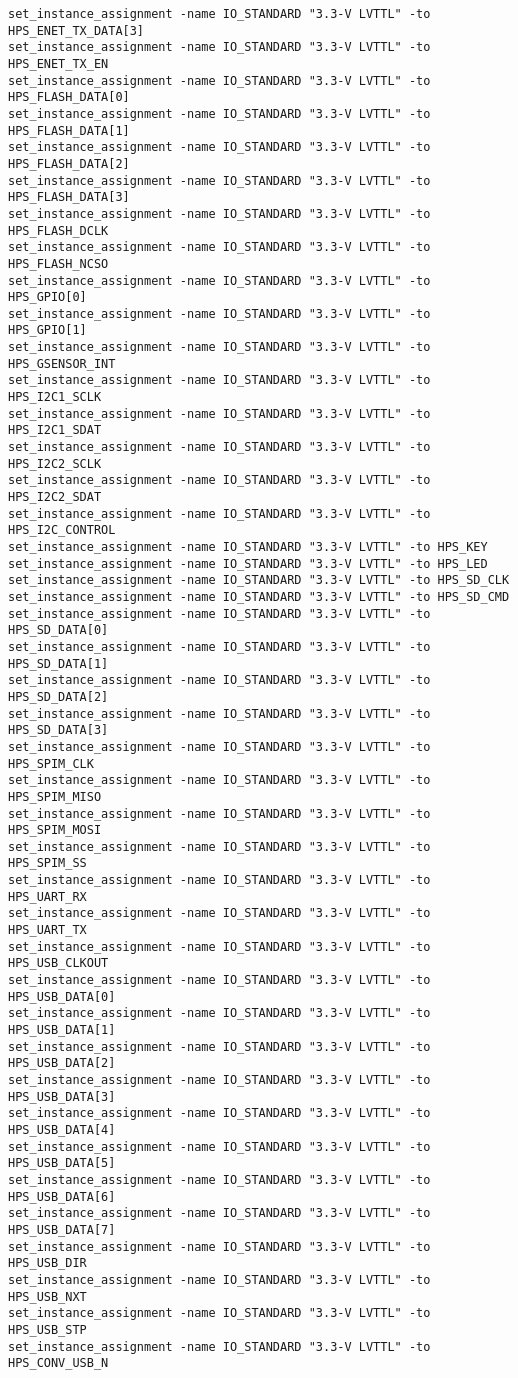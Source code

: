 \begin{verbatim}
set_instance_assignment -name IO_STANDARD "3.3-V LVTTL" -to HPS_ENET_TX_DATA[3]
set_instance_assignment -name IO_STANDARD "3.3-V LVTTL" -to HPS_ENET_TX_EN
set_instance_assignment -name IO_STANDARD "3.3-V LVTTL" -to HPS_FLASH_DATA[0]
set_instance_assignment -name IO_STANDARD "3.3-V LVTTL" -to HPS_FLASH_DATA[1]
set_instance_assignment -name IO_STANDARD "3.3-V LVTTL" -to HPS_FLASH_DATA[2]
set_instance_assignment -name IO_STANDARD "3.3-V LVTTL" -to HPS_FLASH_DATA[3]
set_instance_assignment -name IO_STANDARD "3.3-V LVTTL" -to HPS_FLASH_DCLK
set_instance_assignment -name IO_STANDARD "3.3-V LVTTL" -to HPS_FLASH_NCSO
set_instance_assignment -name IO_STANDARD "3.3-V LVTTL" -to HPS_GPIO[0]
set_instance_assignment -name IO_STANDARD "3.3-V LVTTL" -to HPS_GPIO[1]
set_instance_assignment -name IO_STANDARD "3.3-V LVTTL" -to HPS_GSENSOR_INT
set_instance_assignment -name IO_STANDARD "3.3-V LVTTL" -to HPS_I2C1_SCLK
set_instance_assignment -name IO_STANDARD "3.3-V LVTTL" -to HPS_I2C1_SDAT
set_instance_assignment -name IO_STANDARD "3.3-V LVTTL" -to HPS_I2C2_SCLK
set_instance_assignment -name IO_STANDARD "3.3-V LVTTL" -to HPS_I2C2_SDAT
set_instance_assignment -name IO_STANDARD "3.3-V LVTTL" -to HPS_I2C_CONTROL
set_instance_assignment -name IO_STANDARD "3.3-V LVTTL" -to HPS_KEY
set_instance_assignment -name IO_STANDARD "3.3-V LVTTL" -to HPS_LED
set_instance_assignment -name IO_STANDARD "3.3-V LVTTL" -to HPS_SD_CLK
set_instance_assignment -name IO_STANDARD "3.3-V LVTTL" -to HPS_SD_CMD
set_instance_assignment -name IO_STANDARD "3.3-V LVTTL" -to HPS_SD_DATA[0]
set_instance_assignment -name IO_STANDARD "3.3-V LVTTL" -to HPS_SD_DATA[1]
set_instance_assignment -name IO_STANDARD "3.3-V LVTTL" -to HPS_SD_DATA[2]
set_instance_assignment -name IO_STANDARD "3.3-V LVTTL" -to HPS_SD_DATA[3]
set_instance_assignment -name IO_STANDARD "3.3-V LVTTL" -to HPS_SPIM_CLK
set_instance_assignment -name IO_STANDARD "3.3-V LVTTL" -to HPS_SPIM_MISO
set_instance_assignment -name IO_STANDARD "3.3-V LVTTL" -to HPS_SPIM_MOSI
set_instance_assignment -name IO_STANDARD "3.3-V LVTTL" -to HPS_SPIM_SS
set_instance_assignment -name IO_STANDARD "3.3-V LVTTL" -to HPS_UART_RX
set_instance_assignment -name IO_STANDARD "3.3-V LVTTL" -to HPS_UART_TX
set_instance_assignment -name IO_STANDARD "3.3-V LVTTL" -to HPS_USB_CLKOUT
set_instance_assignment -name IO_STANDARD "3.3-V LVTTL" -to HPS_USB_DATA[0]
set_instance_assignment -name IO_STANDARD "3.3-V LVTTL" -to HPS_USB_DATA[1]
set_instance_assignment -name IO_STANDARD "3.3-V LVTTL" -to HPS_USB_DATA[2]
set_instance_assignment -name IO_STANDARD "3.3-V LVTTL" -to HPS_USB_DATA[3]
set_instance_assignment -name IO_STANDARD "3.3-V LVTTL" -to HPS_USB_DATA[4]
set_instance_assignment -name IO_STANDARD "3.3-V LVTTL" -to HPS_USB_DATA[5]
set_instance_assignment -name IO_STANDARD "3.3-V LVTTL" -to HPS_USB_DATA[6]
set_instance_assignment -name IO_STANDARD "3.3-V LVTTL" -to HPS_USB_DATA[7]
set_instance_assignment -name IO_STANDARD "3.3-V LVTTL" -to HPS_USB_DIR
set_instance_assignment -name IO_STANDARD "3.3-V LVTTL" -to HPS_USB_NXT
set_instance_assignment -name IO_STANDARD "3.3-V LVTTL" -to HPS_USB_STP
set_instance_assignment -name IO_STANDARD "3.3-V LVTTL" -to HPS_CONV_USB_N


\end{verbatim}
